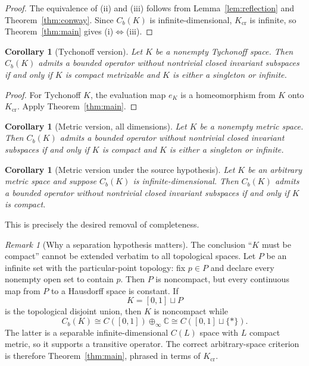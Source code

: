 \documentclass[11pt]{article}
\newtheorem{corollary}[theorem]{Corollary}
\theoremstyle{remark}
\newtheorem{remark}[theorem]{Remark}
\newcommand{\Cb}{C_b}
\newcommand{\C}{\mathbb C}
\begin{document}
\begin{proof}
The equivalence of \textup{(ii)} and \textup{(iii)} follows from
Lemma~\ref{lem:reflection} and Theorem~\ref{thm:conway}.  Since
$\Cb(K)$ is infinite-dimensional, $K_{\mathrm{cr}}$ is infinite, so
Theorem~\ref{thm:main} gives \textup{(i)$\Leftrightarrow$(iii)}.
\end{proof}

\begin{corollary}[Tychonoff version]\label{cor:tych}
Let $K$ be a nonempty Tychonoff space.  Then $\Cb(K)$ admits a bounded
operator without nontrivial closed invariant subspaces if and only if $K$ is
compact metrizable and $K$ is either a singleton or infinite.
\end{corollary}

\begin{proof}
For Tychonoff $K$, the evaluation map $e_K$ is a homeomorphism from $K$ onto
$K_{\mathrm{cr}}$.  Apply Theorem~\ref{thm:main}.
\end{proof}

\begin{corollary}[Metric version, all dimensions]\label{cor:metric-all}
Let $K$ be a nonempty metric space.  Then $\Cb(K)$ admits a bounded operator
without nontrivial closed invariant subspaces if and only if $K$ is compact
and $K$ is either a singleton or infinite.
\end{corollary}

\begin{corollary}[Metric version under the source hypothesis]\label{cor:metric}
Let $K$ be an arbitrary metric space and suppose $\Cb(K)$ is
infinite-dimensional.  Then $\Cb(K)$ admits a bounded operator without
nontrivial closed invariant subspaces if and only if $K$ is compact.
\end{corollary}

This is precisely the desired removal of completeness.

\begin{remark}[Why a separation hypothesis matters]
The conclusion ``$K$ must be compact'' cannot be extended verbatim to all
topological spaces.  Let $P$ be an infinite set with the particular-point
topology: fix $p\in P$ and declare every nonempty open set to contain $p$.
Then $P$ is noncompact, but every continuous map from $P$ to a Hausdorff space
is constant.  If
\[
  K=[0,1]\sqcup P
\]
is the topological disjoint union, then $K$ is noncompact while
\[
  \Cb(K)\cong C([0,1])\oplus_\infty\C
       \cong C([0,1]\sqcup\{*\}).
\]
The latter is a separable infinite-dimensional $C(L)$ space with $L$ compact
metric, so it supports a transitive operator.  The correct arbitrary-space
criterion is therefore Theorem~\ref{thm:main}, phrased in terms of
$K_{\mathrm{cr}}$.
\end{remark}
\end{document}
